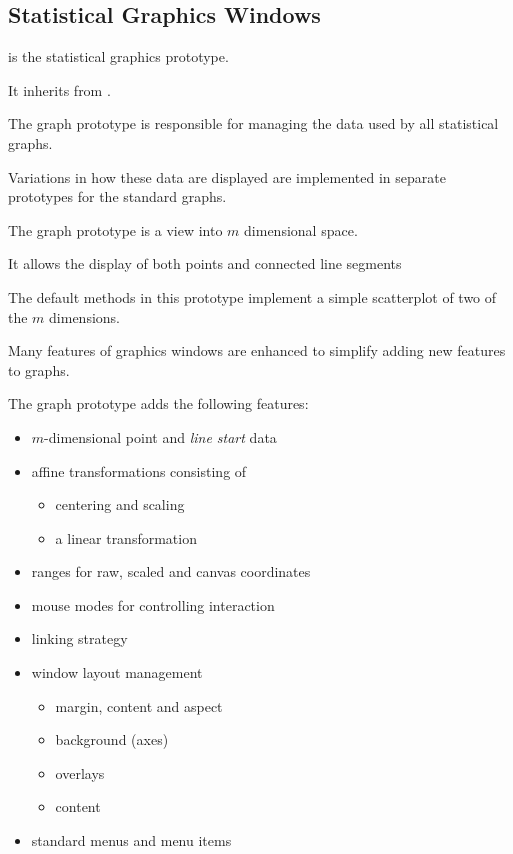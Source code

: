 \begin{slide}{}
\section{Statistical Graphics Windows}
 is the statistical graphics prototype.

It inherits from .

The graph prototype is responsible for managing the data used
by all statistical graphs.

Variations in how these data are displayed are implemented in
separate prototypes for the standard graphs.
\end{slide}

\begin{slide}{}
The graph prototype is a view into $m$ dimensional space.

It allows the display of both points and connected line segments

The default methods in this prototype implement a simple scatterplot
of two of the $m$ dimensions.

Many features of graphics windows are enhanced to simplify
adding new features to graphs.
\end{slide}

\begin{slide}{}
The graph prototype adds the following features:
\begin{itemize}
\item $m$-dimensional point and {\em line start}\/ data
\item affine transformations consisting of
\begin{itemize}
\item centering and scaling
\item a linear transformation
\end{itemize}
\item ranges for raw, scaled and canvas coordinates
\item mouse modes for controlling interaction
\item linking strategy
\item window layout management
\begin{itemize}
\item margin, content and aspect
\item background (axes)
\item overlays
\item content
\end{itemize}
\item standard menus and menu items
\end{itemize}
\end{slide}

